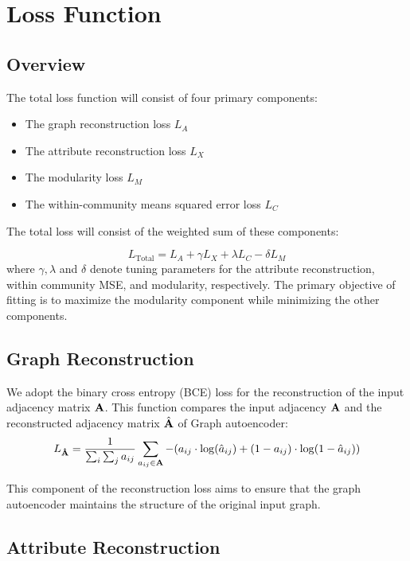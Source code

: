 \documentclass[a4paper,12pt]{article}
\begin{document}
					

			\section{Loss Function}

				\subsection*{Overview}
					
					The total loss function will consist of four primary components: 
					\begin{itemize}
						\item The graph reconstruction loss ${L}_A$
						\item The attribute reconstruction loss ${L}_X$
						\item The modularity loss ${L}_M$
						\item The within-community means squared error loss ${L}_C$
					\end{itemize}
					The total loss will consist of the weighted sum of these components:
					
					\[L_{\text{Total}} = L_A + \gamma L_X + \lambda L_{C} - \delta L_M \]
					where $\gamma, \lambda$ and $\delta$ denote tuning parameters for the attribute reconstruction, within community MSE, and modularity, respectively. The primary objective of fitting is to maximize the modularity component while minimizing the other components. \\
				
					
				\subsection*{Graph Reconstruction}
				
					We adopt the binary cross entropy (BCE) loss for the reconstruction of the input adjacency matrix ${\bf A}$. This function compares the input adjacency $\bf A$ and the reconstructed adjacency matrix  $\hat{\bf A}$ of Graph autoencoder: 
					\[L_{\bf \hat{A}} = \frac{1}{\sum_i\sum_j a_{ij}} \sum_{a_{ij}\in {\bf A}} -(a_{ij} \cdot\log(\hat{a}_{ij})+(1 - a_{ij})\cdot\log(1 - \hat{a}_{ij})) \]
					
					This component of the reconstruction loss aims to ensure that the graph autoencoder maintains the structure of the original input graph. \\
					
				
				
				\subsection*{Attribute Reconstruction}
					
\end{document}
